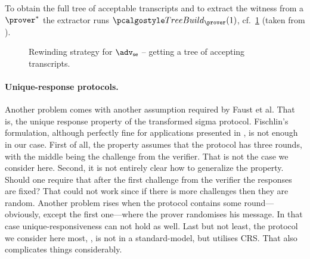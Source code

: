 \documentclass[runningheads,11pt]{llncs}
\theoremstyle{definition}
\begin{document}
To obtain the full tree of acceptable transcripts and to extract the witness from a $\prover^*$ the extractor runs $\treebuild_\prover (1)$, cf.~\cref{fig:rewinding_prover} (taken from \cite{EC:BCCGP16}).

\begin{figure}
	\centering
	\caption{Rewinding strategy for $\adv_\se$ -- getting a tree of accepting transcripts.}
	\label{fig:rewinding_prover}
\end{figure}

\paragraph{Unique-response protocols.}
Another problem comes with another assumption required by Faust et al. That is, the unique response property of the transformed sigma protocol.
Fischlin's formulation, although perfectly fine for applications presented in \cite{C:Fischlin05}, is not enough in our case.
First of all, the property assumes that the protocol has three rounds, with the middle being the challenge from the verifier. That is not the case we consider here. Second, it is not entirely clear how to generalize the property. Should one require that after the first challenge from the verifier the responses are fixed? That could not work since if there is more challenges then they are random.
Another problem rises when the protocol contains some round---obviously, except the first one---where the prover randomises his message. In that case unique-responsiveness can not hold as well.
Last but not least, the protocol we consider here most, \plonk, is not in a standard-model, but utilises CRS. That also complicates things considerably.
\end{document}
